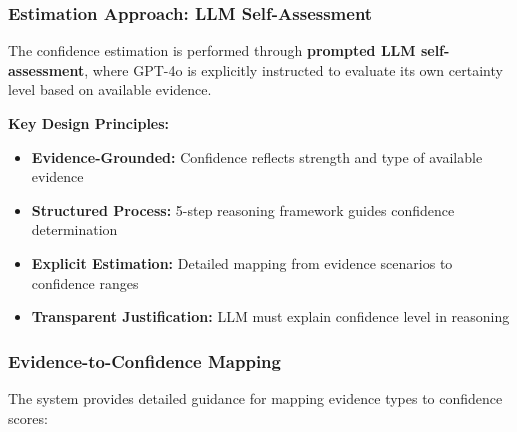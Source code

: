 \documentclass[11pt,a4paper]{article}
\begin{document}
\subsubsection{Estimation Approach: LLM Self-Assessment}

The confidence estimation is performed through \textbf{prompted LLM self-assessment}, where GPT-4o is explicitly instructed to evaluate its own certainty level based on available evidence.

\textbf{Key Design Principles:}
\begin{itemize}[leftmargin=*]
    \item \textbf{Evidence-Grounded:} Confidence reflects strength and type of available evidence
    \item \textbf{Structured Process:} 5-step reasoning framework guides confidence determination
    \item \textbf{Explicit Estimation:} Detailed mapping from evidence scenarios to confidence ranges
    \item \textbf{Transparent Justification:} LLM must explain confidence level in reasoning
\end{itemize}

\subsubsection{Evidence-to-Confidence Mapping}

The system provides detailed guidance for mapping evidence types to confidence scores:
\end{document}

